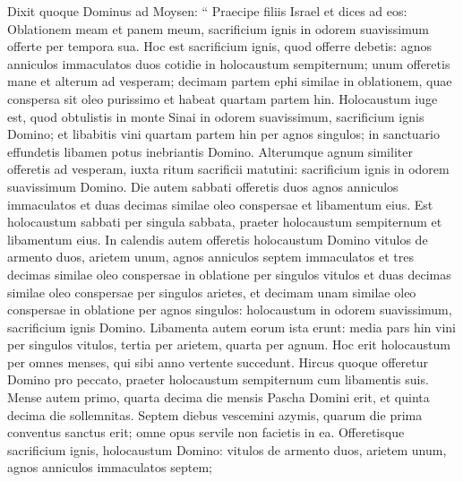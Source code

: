 \begin{biblechapter}
\begin{biblechapter}
\begin{biblechapter}
\begin{biblechapter}
\begin{biblechapter}
\begin{biblechapter}
\begin{biblechapter}
\begin{biblechapter}
\begin{biblechapter}
\begin{biblechapter}
\begin{biblechapter}
\begin{biblechapter}
\begin{biblechapter}
\begin{biblechapter}
\begin{biblechapter}
\begin{biblechapter}
\begin{biblechapter}
\begin{biblechapter}
\begin{biblechapter}
\begin{biblechapter}
\begin{biblechapter}
\begin{biblechapter}
\begin{biblechapter}
\begin{biblechapter}
\begin{biblechapter}
\begin{biblechapter}
\begin{biblechapter}
\begin{biblechapter}
\verse Dixit quoque Dominus ad Moysen: 
\verse “ Praecipe filiis Israel et dices ad eos: Oblationem meam et panem meum, sacrificium ignis in odorem suavissimum offerte per tempora sua.
 \verse Hoc est sacrificium ignis, quod offerre debetis: agnos anniculos immaculatos duos cotidie in holocaustum sempiternum; 
\verse unum offeretis mane et alterum ad vesperam; 
\verse decimam partem ephi similae in oblationem, quae conspersa sit oleo purissimo et habeat quartam partem hin. 
\verse Holocaustum iuge est, quod obtulistis in monte Sinai in odorem suavissimum, sacrificium ignis Domino; 
\verse et libabitis vini quartam partem hin per agnos singulos; in sanctuario effundetis libamen potus inebriantis Domino. 
\verse Alterumque agnum similiter offeretis ad vesperam, iuxta ritum sacrificii matutini: sacrificium ignis in odorem suavissimum Domino.
 \verse Die autem sabbati offeretis duos agnos anniculos immaculatos et duas decimas similae oleo conspersae et libamentum eius. 
\verse Est holocaustum sabbati per singula sabbata, praeter holocaustum sempiternum et libamentum eius.
 \verse In calendis autem offeretis holocaustum Domino vitulos de armento duos, arietem unum, agnos anniculos septem immaculatos 
\verse et tres decimas similae oleo conspersae in oblatione per singulos vitulos et duas decimas similae oleo conspersae per singulos arietes, 
\verse et decimam unam similae oleo conspersae in oblatione per agnos singulos: holocaustum in odorem suavissimum, sacrificium ignis Domino. 
\verse Libamenta autem eorum ista erunt: media pars hin vini per singulos vitulos, tertia per arietem, quarta per agnum. Hoc erit holocaustum per omnes menses, qui sibi anno vertente succedunt. 
\verse Hircus quoque offeretur Domino pro peccato, praeter holocaustum sempiternum cum libamentis suis.
 \verse Mense autem primo, quarta decima die mensis Pascha Domini erit, 
\verse et quinta decima die sollemnitas. Septem diebus vescemini azymis, 
\verse quarum die prima conventus sanctus erit; omne opus servile non facietis in ea. 
\verse Offeretisque sacrificium ignis, holocaustum Domino: vitulos de armento duos, arietem unum, agnos anniculos immaculatos septem; 

\end{biblechapter}
\end{biblechapter}
\end{biblechapter}
\end{biblechapter}
\end{biblechapter}
\end{biblechapter}
\end{biblechapter}
\end{biblechapter}
\end{biblechapter}
\end{biblechapter}
\end{biblechapter}
\end{biblechapter}
\end{biblechapter}
\end{biblechapter}
\end{biblechapter}
\end{biblechapter}
\end{biblechapter}
\end{biblechapter}
\end{biblechapter}
\end{biblechapter}
\end{biblechapter}
\end{biblechapter}
\end{biblechapter}
\end{biblechapter}
\end{biblechapter}
\end{biblechapter}
\end{biblechapter}
\end{biblechapter}

